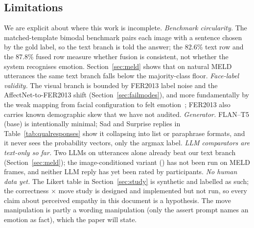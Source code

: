\documentclass[sigconf,nonacm]{acmart}
\begin{document}
  \subsection{Limitations}
  We are explicit about where this work is incomplete. \emph{Benchmark circularity.} The matched-template bimodal benchmark pairs each image with a sentence chosen by the gold label, so the text branch is told the answer; the 82.6\% text row and the 87.8\% fused row measure whether fusion is consistent, not whether the system recognises emotion. Section~\ref{sec:meld} shows that on natural MELD utterances the same text branch falls below the majority-class floor. \emph{Face-label validity.} The visual branch is bounded by FER2013 label noise and the AffectNet-to-FER2013 shift (Section~\ref{sec:failmodes}), and more fundamentally by the weak mapping from facial configuration to felt emotion~\cite{barrett2019emotional}; FER2013 also carries known demographic skew that we have not audited. \emph{Generator.} FLAN--T5 (base) is intentionally minimal; Sad and Surprise replies in Table~\ref{tab:qualresponses} show it collapsing into list or paraphrase formats, and it never sees the probability vectors, only the argmax label. \emph{LLM comparators are text-only so far.} Two LLMs on utterances alone already beat our text branch (Section~\ref{sec:meld}); the image-conditioned variant () has not been run on MELD frames, and neither LLM reply has yet been rated by participants. \emph{No human data yet.} The Likert table in Section~\ref{sec:study} is synthetic and labelled as such; the correctness $\times$ move study is designed and implemented but not run, so every claim about perceived empathy in this document is a hypothesis. The move manipulation is partly a wording manipulation (only the assert prompt names an emotion as fact), which the paper will state.
\end{document}
